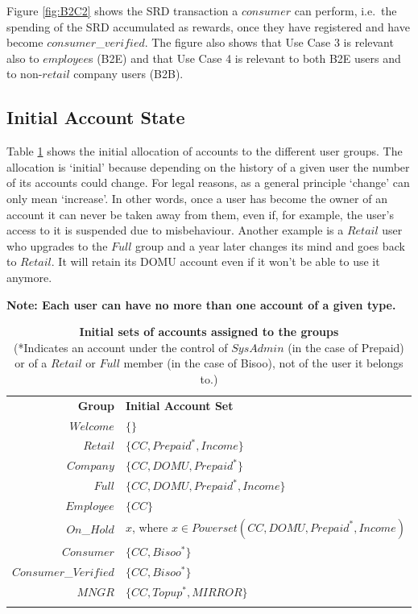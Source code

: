 Figure \ref{fig:B2C2} shows the SRD transaction a $consumer$ can perform, i.e.\ the spending of the SRD accumulated as rewards, once they have registered and have become $consumer$\_$verified$. The figure also shows that Use Case 3 is relevant also to $employee$s (B2E) and that Use Case 4 is relevant to both B2E users and to non-$retail$ company users (B2B).

\subsection{Initial Account State}
Table \ref{tab:InitialAccountSets} shows the initial allocation of accounts to the different user groups. The allocation is `initial' because  depending on the history of a given user the number of its accounts could change. For legal reasons, as a general principle `change' can only mean `increase'. In other words, once a user has become the owner of an account it can never be taken away from them, even if, for example, the user's access to it is suspended due to misbehaviour. Another example is a $Retail$ user who upgrades to the $Full$ group and a year later changes its mind and goes back to $Retail$. It will retain its DOMU account even if it won't be able to use it anymore.

{\bf Note: Each user can have no more than one account of a given type.}

\begin{table}[h]
\vspace{-0.5cm}
\begin{centering}
\small
{
\begin{tabular}{ r | l  }
\hline
\textbf{Group}	& {\bf Initial Account Set} \\
\Xhline{1.5pt}
$Welcome$	& $\{ \}$ \\
\hline
$Retail$		& $\{ CC, Prepaid^*, Income \}$ \\
\hline
$Company$	& $\{ CC, DOMU, Prepaid^* \}$ \\
\hline
$Full$		& $\{ CC, DOMU, Prepaid^*, Income \}$ \\
\hline
$Employee$	& $\{ CC \}$ \\
\hline
$On$\_$Hold$	& $x$, where $x \in Powerset(CC, DOMU, Prepaid^*, Income)$ \\
\hline
$Consumer$	& $\{ CC, Bisoo^* \}$ \\
\hline
$Consumer$\_$Verified$ & $\{ CC, Bisoo^* \}$ \\
\hline
$MNGR$ 		& $\{ CC, Topup^*, MIRROR \}$ \\
\Xhline{1.5pt}
\end{tabular}
}
\caption{\small\textbf{Initial sets of accounts assigned to the groups}\\ (*Indicates an account under the control of $SysAdmin$ (in the case of Prepaid)\\ or of a $Retail$ or $Full$ member (in the case of Bisoo), not of the user it belongs to.)}
\label{tab:InitialAccountSets}
\end{centering}
\vspace{-1cm}
\end{table}

